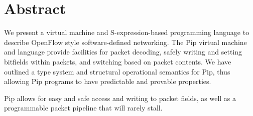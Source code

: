 
\section{Abstract}
We present a virtual machine and S-expression-based programming language to describe OpenFlow style software-defined networking. The Pip virtual machine and language provide facilities for packet decoding, safely writing and setting bitfields within packets, and switching based on packet contents. We have outlined a type system and structural operational semantics for Pip, thus allowing Pip programs to have predictable and provable properties.

Pip allows for easy and safe access and writing to packet fields, as well as a programmable packet pipeline that will rarely stall.
